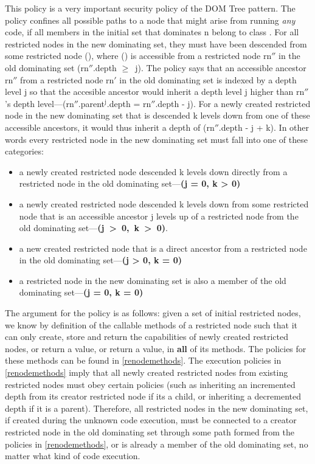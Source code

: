 \documentclass[a4paper,11pt,twoside]{article}
\newcommand{\losup}[1]{$^{\text{#1}}$}
\newcommand{\logeq}{$\geq$\ }
\begin{document}
This policy is a very important security policy of the DOM Tree pattern.
The policy confines all possible paths to a node  that might arise from running \textit{any} code, if all members in the initial set that dominates n belong to class .
For all restricted nodes in the new dominating set, they must have been descended from some restricted node (\sf{rn$''$.parent\losup{j}}), where (\sf{rn$''$.parent\losup{j}}) is accessible from a restricted node rn$''$ in the old dominating set (rn$''$.depth \logeq j). The policy says that an accessible ancestor rn$''$ from a restricted node rn$'$ in the old dominating set is indexed by a depth level j so that the accesible ancestor would inherit a depth level j higher than rn$''$'s depth level---(rn$''$.parent\losup{j}.depth = rn$''$.depth - j). For a newly created restricted node  in the new dominating set that is descended k levels down from one of these accessible ancestors, it would thus inherit a depth of (rn$''$.depth - j + k). In other words every restricted node in the new dominating set must fall into one of these categories:
\begin{itemize}
\item a newly created restricted node descended k levels down directly from a restricted node in the old dominating set---\textbf{(j = 0, k > 0)}
\item a newly created restricted node descended k levels down from some restricted node that is an accessible ancestor j levels up of a restricted node from the old dominating set---\mbox{\textbf{(j > 0, k > 0)}}.
\item a new created restricted node that is a direct ancestor from a restricted node in the old dominating set---\textbf{(j > 0, k = 0)}
\item a restricted node in the new dominating set is also a member of the old dominating set---\textbf{(j = 0, k = 0)}
\end{itemize}
The argument for the policy is as follows: given a set of initial restricted nodes, we know by definition of the callable methods of a restricted node such that it can only create, store and return the capabilities of newly created restricted nodes, or return a  value, or return a  value, in \textbf{all} of its methods. The policies for these methods can be found in \cref{renodemethods}. The execution policies in 
\cref{renodemethods} imply that all newly created restricted nodes from existing restricted nodes must obey certain policies (such as inheriting an incremented depth from its creator restricted node if its a child, or inheriting a decremented depth if it is a parent). Therefore, all restricted nodes in the new dominating set, if created during the unknown code execution, must be connected to a creator restricted node in the old dominating set through some path formed from the policies in \cref{renodemethods}, or is already a member of the old dominating set, no matter what kind of code execution. 
\end{document}
